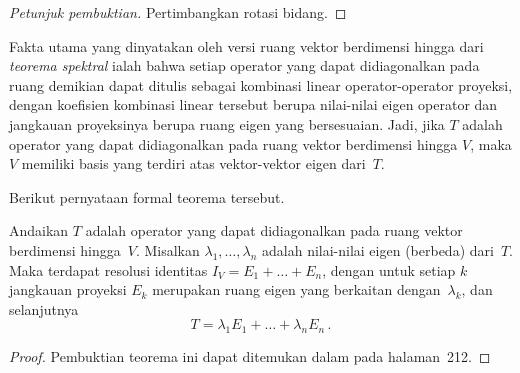 \begin{proof}[\emph{Petunjuk pembuktian}] Pertimbangkan rotasi bidang.  \ns
\end{proof}

Fakta utama yang dinyatakan oleh versi ruang vektor berdimensi hingga dari
\emph{teorema spektral} ialah bahwa setiap operator yang dapat didiagonalkan pada ruang demikian dapat
ditulis sebagai kombinasi linear operator-operator proyeksi, dengan koefisien kombinasi
linear tersebut berupa nilai-nilai eigen operator dan jangkauan proyeksinya berupa
ruang eigen yang bersesuaian. Jadi, jika $T$ adalah operator yang dapat didiagonalkan pada ruang vektor
berdimensi hingga $V$, maka $V$ memiliki basis yang terdiri atas vektor-vektor eigen dari~$T$.

Berikut pernyataan formal teorema tersebut.

\begin{thm} Andaikan $T$ adalah
operator yang dapat didiagonalkan pada ruang vektor berdimensi hingga~$V$. Misalkan $\lambda_1, \dots, \lambda_n$ adalah
nilai-nilai eigen (berbeda) dari~$T$. Maka terdapat resolusi identitas $I_V =
E_1 + \dots + E_n$, dengan untuk setiap $k$ jangkauan proyeksi $E_k$ merupakan
ruang eigen yang berkaitan dengan~$\lambda_k$, dan selanjutnya
     \[ T = \lambda_1E_1 +\dots + \lambda_nE_n\,. \]
\end{thm}

\begin{proof} Pembuktian teorema ini dapat ditemukan dalam \cite{HoffmanK:1971} pada halaman~212. \ns
\end{proof}

